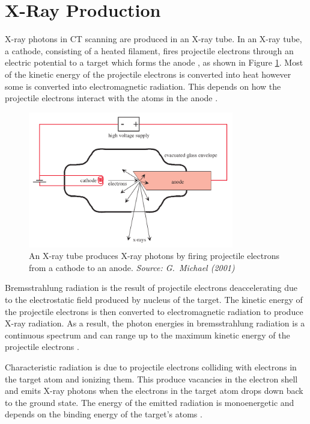 \documentclass[12pt]{report}
\begin{document}
\section{X-Ray Production}
X-ray photons in CT scanning are produced in an X-ray tube. In an X-ray tube, a cathode, consisting of a heated filament, fires projectile electrons through an electric potential to a target which forms the anode \cite{michael2001x}, as shown in Figure \ref{fig:x_ray_tube}. Most of the kinetic energy of the projectile electrons is converted into heat however some is converted into electromagnetic radiation. This depends on how the projectile electrons interact with the atoms in the anode \cite{cantatore2011introduction}.

\begin{figure}
\centering
\includegraphics[width=0.8\textwidth]{figures/x_ray_tube.png}
\caption{An X-ray tube produces X-ray photons by firing projectile electrons from a cathode to an anode. \emph{Source: G.~Michael (2001) \cite{michael2001x}}}
\label{fig:x_ray_tube}
\end{figure}

Bremsstrahlung radiation is the result of projectile electrons deaccelerating due to the electrostatic field produced by nucleus of the target. The kinetic energy of the projectile electrons is then converted to electromagnetic radiation to produce X-ray radiation. As a result, the photon energies in bremsstrahlung radiation is  a continuous spectrum and can range up to the maximum kinetic energy of the projectile electrons \cite{michael2001x}.

Characteristic radiation is due to projectile electrons colliding with electrons in the target atom and ionizing them. This produce vacancies in the electron shell and emits X-ray photons when the electrons in the target atom drops down back to the ground state. The energy of the emitted radiation is monoenergetic and depends on the binding energy of the target's atoms \cite{michael2001x}.
\end{document}
